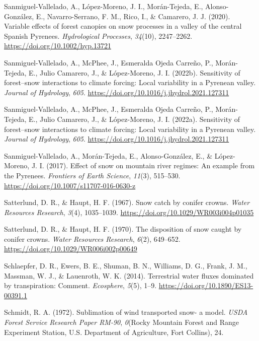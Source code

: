 \documentclass[
  letterpaper,
]{tex/uofsthesis-cs}
\newlength{\cslhangindent}
\newenvironment{CSLReferences}[2] %
 {\begin{list}{}{%
  \setlength{\itemindent}{0pt}
  \setlength{\leftmargin}{0pt}
  \setlength{\parsep}{0pt}
  \ifodd #1
   \setlength{\leftmargin}{\cslhangindent}
   \setlength{\itemindent}{-1\cslhangindent}
  \fi
  \setlength{\itemsep}{#2\baselineskip}}}
 {\end{list}}
\begin{document}
\begin{CSLReferences}{1}{0}
Sanmiguel-Vallelado, A., López-Moreno, J. I., Morán-Tejeda, E.,
Alonso-González, E., Navarro-Serrano, F. M., Rico, I., \& Camarero, J.
J. (2020). Variable effects of forest canopies on snow processes in a
valley of the central {Spanish Pyrenees}. \emph{Hydrological Processes},
\emph{34}(10), 2247--2262. \url{https://doi.org/10.1002/hyp.13721}

Sanmiguel-Vallelado, A., McPhee, J., Esmeralda Ojeda Carreño, P.,
Morán-Tejeda, E., Julio Camarero, J., \& López-Moreno, J. I. (2022b).
Sensitivity of forest--snow interactions to climate forcing: {Local}
variability in a {Pyrenean} valley. \emph{Journal of Hydrology},
\emph{605}. \url{https://doi.org/10.1016/j.jhydrol.2021.127311}

Sanmiguel-Vallelado, A., McPhee, J., Esmeralda Ojeda Carreño, P.,
Morán-Tejeda, E., Julio Camarero, J., \& López-Moreno, J. I. (2022a).
Sensitivity of forest--snow interactions to climate forcing: {Local}
variability in a {Pyrenean} valley. \emph{Journal of Hydrology},
\emph{605}. \url{https://doi.org/10.1016/j.jhydrol.2021.127311}

Sanmiguel-Vallelado, A., Morán-Tejeda, E., Alonso-González, E., \&
López-Moreno, J. I. (2017). Effect of snow on mountain river regimes: An
example from the {Pyrenees}. \emph{Frontiers of Earth Science},
\emph{11}(3), 515--530. \url{https://doi.org/10.1007/s11707-016-0630-z}

Satterlund, D. R., \& Haupt, H. F. (1967). Snow catch by conifer crowns.
\emph{Water Resources Research}, \emph{3}(4), 1035--1039.
\url{https://doi.org/10.1029/WR003i004p01035}

Satterlund, D. R., \& Haupt, H. F. (1970). The disposition of snow
caught by conifer crowns. \emph{Water Resources Research}, \emph{6}(2),
649--652. \url{https://doi.org/10.1029/WR006i002p00649}

Schlaepfer, D. R., Ewers, B. E., Shuman, B. N., Williams, D. G., Frank,
J. M., Massman, W. J., \& Lauenroth, W. K. (2014). Terrestrial water
fluxes dominated by transpiration: {Comment}. \emph{Ecosphere},
\emph{5}(5), 1--9. \url{https://doi.org/10.1890/ES13-00391.1}

Schmidt, R. A. (1972). Sublimation of wind transported snow- a model.
\emph{USDA Forest Service Research Paper RM-90}, \emph{0}(Rocky Mountain
Forest and Range Experiment Station, U.S. Department of Agriculture,
Fort Collins), 24.


\end{CSLReferences}
\end{document}
